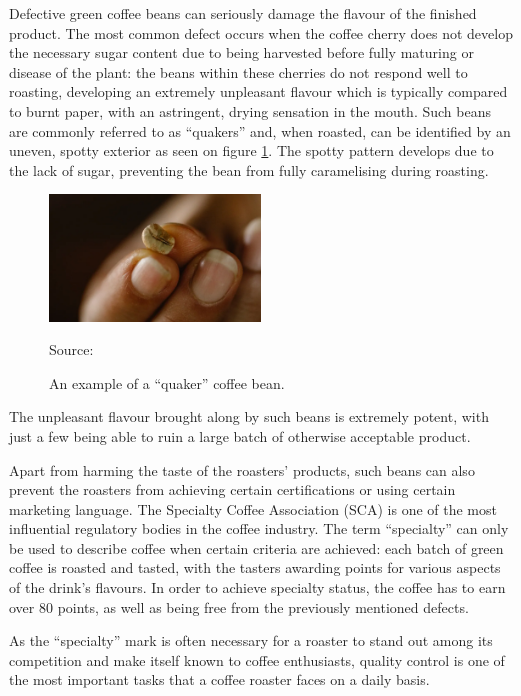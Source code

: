 Defective green coffee beans can seriously damage the flavour of the finished
product. The most common defect occurs when the coffee cherry does not develop the
necessary sugar content due to being harvested before fully maturing or disease of
the plant: the beans within these cherries do not respond well to roasting, developing
an extremely unpleasant flavour which is typically compared to burnt paper, with
an astringent, drying sensation in the mouth. Such beans are commonly referred
to as ``quakers'' and, when roasted, can be identified by an uneven, spotty exterior
as seen on figure \ref{fig:quakerBeanExample}. The spotty pattern develops due
to the lack of sugar, preventing the bean from fully caramelising during roasting.
\begin{figure}
	\includegraphics[width=0.5\textwidth]{figures/introduction/quaker-coffee-bean}
	\caption*
	{Source: \cite{quakerBeanImg}}
	\caption{An example of a ``quaker'' coffee bean.}
	\label{fig:quakerBeanExample}
\end{figure}
The unpleasant flavour brought along by such beans is extremely potent, with just
a few being able to ruin a large batch of otherwise acceptable product.

Apart from harming the taste of the roasters' products, such beans can also prevent
the roasters from achieving certain certifications or using certain marketing language.
The Specialty Coffee Association (SCA) is one of the most influential regulatory
bodies in the coffee industry. The term ``specialty'' can only be used to describe
coffee when certain criteria are achieved: each batch of green coffee is roasted
and tasted, with the tasters awarding points for various aspects of the drink's flavours.
In order to achieve specialty status, the coffee has to earn over 80 points, as
well as being free from the previously mentioned defects.

As the ``specialty'' mark is often necessary for a roaster to stand out among
its competition and make itself known to coffee enthusiasts, quality control is one
of the most important tasks that a coffee roaster faces on a daily basis.

